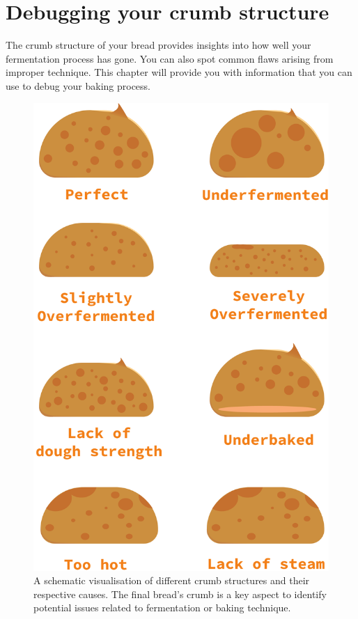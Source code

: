\section{Debugging your crumb structure}
\label{section:debugging-crumb-structure}

The crumb structure of your bread provides insights into how well
your fermentation process has gone. You can also spot common flaws
arising from improper technique. This chapter will provide you with information
that you can use to debug your baking process.

\begin{figure}
  \includegraphics[width=\textwidth]{crumb-structures-book}
  \caption{A schematic visualisation of different crumb structures and their respective causes. The
  final bread's crumb is a key aspect to identify potential issues related to fermentation
  or baking technique.}
  \label{fig:crumb-structures-book}
\end{figure}

